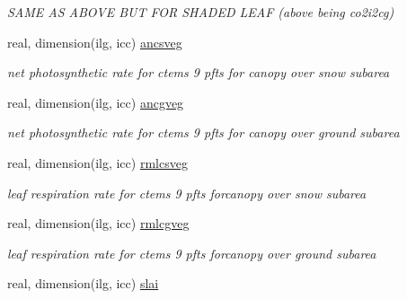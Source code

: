\begin{DoxyCompactItemize}
\begin{DoxyCompactList}\small\item\em S\+A\+M\+E A\+S A\+B\+O\+V\+E B\+U\+T F\+O\+R S\+H\+A\+D\+E\+D L\+E\+A\+F (above being co2i2cg) \end{DoxyCompactList}\item 
\hypertarget{structctem__statevars_1_1veg__gat_ae92528c4e0389f4b165d9c6aa7e0b4b8}{}real, dimension(ilg, icc) \hyperlink{structctem__statevars_1_1veg__gat_ae92528c4e0389f4b165d9c6aa7e0b4b8}{ancsveg}\label{structctem__statevars_1_1veg__gat_ae92528c4e0389f4b165d9c6aa7e0b4b8}

\begin{DoxyCompactList}\small\item\em net photosynthetic rate for ctems 9 pfts for canopy over snow subarea \end{DoxyCompactList}\item 
\hypertarget{structctem__statevars_1_1veg__gat_a16007e458f878936c4ec2870ad633115}{}real, dimension(ilg, icc) \hyperlink{structctem__statevars_1_1veg__gat_a16007e458f878936c4ec2870ad633115}{ancgveg}\label{structctem__statevars_1_1veg__gat_a16007e458f878936c4ec2870ad633115}

\begin{DoxyCompactList}\small\item\em net photosynthetic rate for ctems 9 pfts for canopy over ground subarea \end{DoxyCompactList}\item 
\hypertarget{structctem__statevars_1_1veg__gat_a07528b7feffe67997312d503039bbbb3}{}real, dimension(ilg, icc) \hyperlink{structctem__statevars_1_1veg__gat_a07528b7feffe67997312d503039bbbb3}{rmlcsveg}\label{structctem__statevars_1_1veg__gat_a07528b7feffe67997312d503039bbbb3}

\begin{DoxyCompactList}\small\item\em leaf respiration rate for ctems 9 pfts forcanopy over snow subarea \end{DoxyCompactList}\item 
\hypertarget{structctem__statevars_1_1veg__gat_a8de3455b071ac09d386f053a354ff392}{}real, dimension(ilg, icc) \hyperlink{structctem__statevars_1_1veg__gat_a8de3455b071ac09d386f053a354ff392}{rmlcgveg}\label{structctem__statevars_1_1veg__gat_a8de3455b071ac09d386f053a354ff392}

\begin{DoxyCompactList}\small\item\em leaf respiration rate for ctems 9 pfts forcanopy over ground subarea \end{DoxyCompactList}\item 
\hypertarget{structctem__statevars_1_1veg__gat_aa71736482bfe926cd6289a87862c6539}{}real, dimension(ilg, icc) \hyperlink{structctem__statevars_1_1veg__gat_aa71736482bfe926cd6289a87862c6539}{slai}\label{structctem__statevars_1_1veg__gat_aa71736482bfe926cd6289a87862c6539}


\end{DoxyCompactItemize}
